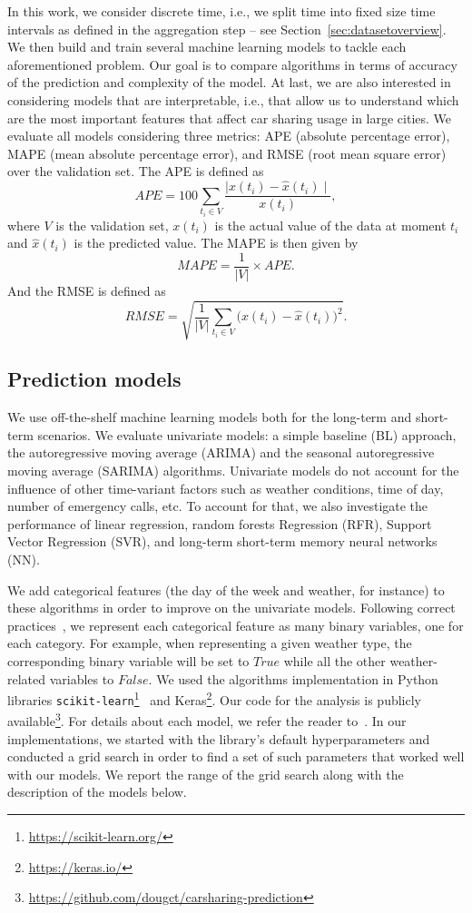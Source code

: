 In this work, we consider discrete time, i.e., we split time into fixed size time intervals as defined in the aggregation step -- see Section~\ref{sec:datasetoverview}. We then build and train several machine learning models to tackle each aforementioned problem. Our goal is to compare algorithms in terms of accuracy of the prediction and complexity of the model.
At last, we are also interested in considering models that are interpretable, i.e., that allow us to understand which are the most important features that affect car sharing usage in large cities.
We evaluate all models considering three metrics: APE (absolute percentage error), MAPE (mean absolute percentage error), and RMSE (root mean square error) over the validation set. The APE is defined as
\[
APE=100\sum_{t_i\in V} \frac{\mid x(t_i) - \hat{x}(t_i)\mid}{x(t_i)},
\]
where $V$ is the validation set, $ x(t_i)$ is the actual value of the data at moment $t_i$ and $\hat{x}(t_i)$ is the predicted value. The MAPE is then given by
\[
MAPE=\frac{1}{|V|} \times APE.
\]
And the RMSE is defined as
\[
RMSE = \sqrt{\frac{1}{|V|}\sum_{t_i \in V}{\Big(x(t_i) - \hat{x}(t_i)\Big)^2}}.
\]

\subsection{Prediction models}

We use off-the-shelf machine learning models both for the long-term and short-term scenarios. We evaluate univariate models: a simple baseline (BL) approach, the autoregressive moving average (ARIMA) and the seasonal autoregressive moving average (SARIMA) algorithms. 
Univariate models do not account for the influence of other time-variant factors such as weather conditions, time of day, number of emergency calls, etc. 
To account for that, we also investigate the performance of linear regression, random forests Regression (RFR), Support Vector Regression (SVR), and long-term short-term memory neural networks (NN).

We add categorical features (the day of the week and weather, for instance) to these algorithms in order to improve on the univariate models. Following correct practices~\citep{jain1990art}, we represent each categorical feature as many binary variables, one for each category. For example, when representing a given weather type, the corresponding binary variable will be set to $True$ while all the other weather-related variables to $False$.
We used the algorithms implementation in Python libraries \texttt{scikit-learn}\footnote{\url{https://scikit-learn.org/}}~\citep{scikitlearn} and Keras\footnote{\url{https://keras.io/}}. 
Our code for the analysis is publicly available\footnote{\url{https://github.com/dougct/carsharing-prediction}}. 
For details about each model, we refer the reader to~\citep{Bishop:2006}. 
In our implementations, we started with the library's default hyperparameters and conducted a grid search in order to find a set of such parameters that worked well with our models. We report the range of the grid search along with the description of the models below.


